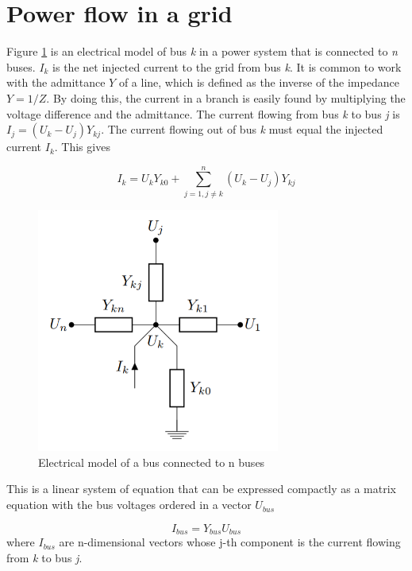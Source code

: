 \documentclass{report}
\begin{document}
\section{Power flow in a grid}
Figure \ref{fig:power_flow_network} is an electrical model of bus \textit{k} in a power system that is connected to \textit{n} buses. $I_{k}$ is the net injected current to the grid from bus \textit{k}\cite{opf_intro}. It is common to work with the admittance $Y$ of a line, which is defined as the inverse of the impedance $Y = 1/Z$. By doing this, the current in a branch is easily found by multiplying the voltage difference and the admittance. The current flowing from bus \textit{k} to bus \textit{j} is $I_{j} = (U_{k} - U_{j})Y_{kj}$. The current flowing out of bus \textit{k} must equal the injected current $I_{k}$. This gives

\begin{equation}\label{eq:powerflow_currentsum}
I_{k} =  U_{k}Y_{k0}
+ \sum_{j=1,j\neq k}^{n}(U_{k} - U_{j})Y_{kj}
\end{equation}


\begin{figure}[ht!]
    \center
    \includegraphics[width=8cm]{figures/power_flow_network.PNG}
    \caption[size = 9]{Electrical model of a bus connected to n buses}
	\label{fig:power_flow_network}
\end{figure}

This is a linear system of equation that can be expressed compactly as a matrix equation with the bus voltages ordered in a vector $U_{bus}$

\begin{equation}\label{eq:powerflow_busmatrix}
I_{bus} = Y_{bus}U_{bus}
\end{equation}
where $I_{bus}$ are n-dimensional vectors whose j-th component is the current flowing from \textit{k} to bus \textit{j}.
\end{document}
